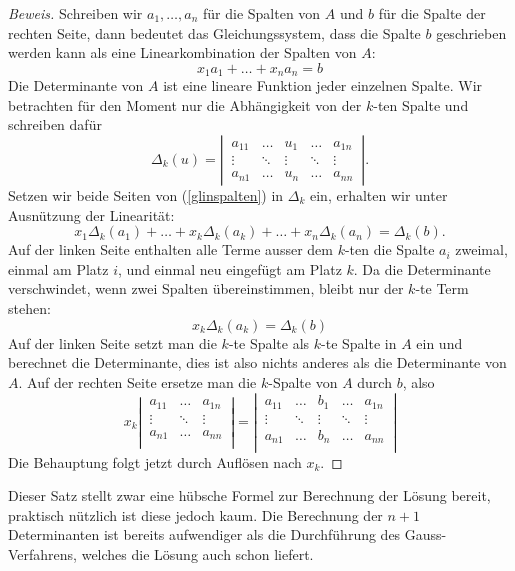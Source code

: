 \begin{proof}[Beweis]
Schreiben wir $a_1,\dots,a_n$ für die Spalten von $A$ und $b$ für die 
Spalte der rechten Seite, dann bedeutet das Gleichungssystem, dass die
Spalte $b$ geschrieben werden kann als eine Linearkombination der
Spalten von $A$:
\begin{equation}
x_1a_1+\dots +x_na_n=b
\label{glinspalten}
\end{equation}
Die Determinante von $A$ ist eine lineare Funktion jeder einzelnen Spalte.
Wir betrachten für den Moment nur die Abhängigkeit von der $k$-ten
Spalte und schreiben dafür
\[
\Delta_k(u)=\left|
\,\begin{matrix}
a_{11}&\dots&u_1&\dots&a_{1n}\\
\vdots&\ddots&\vdots&\ddots&\vdots\\
a_{n1}&\dots&u_n&\dots&a_{nn}
\end{matrix}
\,\right|.
\]
Setzen wir beide Seiten von (\ref{glinspalten}) in $\Delta_k$ ein,
erhalten wir unter Ausnützung der Linearität:
\[
x_1\Delta_k(a_1)+\dots+x_k\Delta_k(a_k)+\dots+x_n\Delta_k(a_n)=\Delta_k(b).
\]
Auf der linken Seite enthalten alle Terme ausser dem $k$-ten die
Spalte $a_i$ zweimal, einmal am Platz $i$, und einmal neu eingefügt am
Platz $k$.
Da die Determinante verschwindet, wenn zwei Spalten übereinstimmen,
bleibt nur der $k$-te Term stehen:
\[
x_k\Delta_k(a_k)=\Delta_k(b)
\]
Auf der linken Seite setzt man die $k$-te Spalte als $k$-te Spalte
in $A$ ein und berechnet die Determinante, dies ist also nichts
anderes als die Determinante von $A$.
Auf der rechten Seite ersetze man die $k$-Spalte von $A$ durch $b$, also
\[
x_k
\left|\,\begin{matrix}
a_{11}&\dots&a_{1n}\\
\vdots&\ddots&\vdots\\
a_{n1}&\dots&a_{nn}\\
\end{matrix}\,\right|
=
\left|\,\begin{matrix}
a_{11}&\dots&b_1&\dots&a_{1n}\\
\vdots&\ddots&\vdots&\ddots&\vdots\\
a_{n1}&\dots&b_n&\dots&a_{nn}\\
\end{matrix}\,\right|
\]
Die Behauptung folgt jetzt durch Auflösen nach $x_k$.
\end{proof}
Dieser Satz stellt zwar eine hübsche Formel zur Berechnung der Lösung
bereit, praktisch nützlich ist diese jedoch kaum.
Die Berechnung der
$n+1$ Determinanten ist bereits aufwendiger als die Durchführung des
Gauss-Verfahrens, welches die Lösung auch schon liefert.

